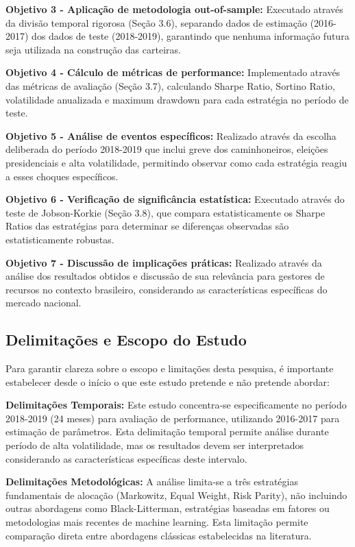 \textbf{Objetivo 3 - Aplicação de metodologia out-of-sample:} Executado através da divisão temporal rigorosa (Seção 3.6), separando dados de estimação (2016-2017) dos dados de teste (2018-2019), garantindo que nenhuma informação futura seja utilizada na construção das carteiras.

\textbf{Objetivo 4 - Cálculo de métricas de performance:} Implementado através das métricas de avaliação (Seção 3.7), calculando Sharpe Ratio, Sortino Ratio, volatilidade anualizada e maximum drawdown para cada estratégia no período de teste.

\textbf{Objetivo 5 - Análise de eventos específicos:} Realizado através da escolha deliberada do período 2018-2019 que inclui greve dos caminhoneiros, eleições presidenciais e alta volatilidade, permitindo observar como cada estratégia reagiu a esses choques específicos.

\textbf{Objetivo 6 - Verificação de significância estatística:} Executado através do teste de Jobson-Korkie (Seção 3.8), que compara estatisticamente os Sharpe Ratios das estratégias para determinar se diferenças observadas são estatisticamente robustas.

\textbf{Objetivo 7 - Discussão de implicações práticas:} Realizado através da análise dos resultados obtidos e discussão de sua relevância para gestores de recursos no contexto brasileiro, considerando as características específicas do mercado nacional.

\subsection{Delimitações e Escopo do Estudo}

Para garantir clareza sobre o escopo e limitações desta pesquisa, é importante estabelecer desde o início o que este estudo pretende e não pretende abordar:

\textbf{Delimitações Temporais:} Este estudo concentra-se especificamente no período 2018-2019 (24 meses) para avaliação de performance, utilizando 2016-2017 para estimação de parâmetros. Esta delimitação temporal permite análise durante período de alta volatilidade, mas os resultados devem ser interpretados considerando as características específicas deste intervalo.

\textbf{Delimitações Metodológicas:} A análise limita-se a três estratégias fundamentais de alocação (Markowitz, Equal Weight, Risk Parity), não incluindo outras abordagens como Black-Litterman, estratégias baseadas em fatores ou metodologias mais recentes de machine learning. Esta limitação permite comparação direta entre abordagens clássicas estabelecidas na literatura.

